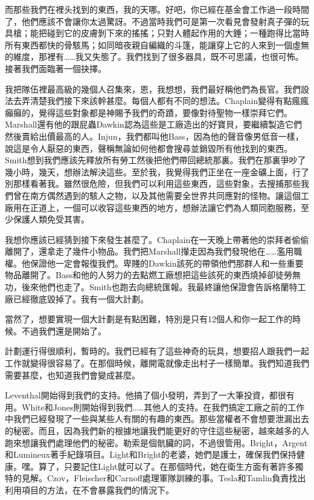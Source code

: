 而那些我們在裡头找到的東西，我的天哪。好吧，你已經在基金會工作過一段時間了，他們應該不會讓你太過驚訝。不過當時我們可是第一次看見會發射真子彈的玩具槍；能把碰到它的皮膚剝下來的搖搖；只對人體起作用的大錘；一種跑得比當時所有東西都快的骨駭馬；如同暗夜親自編織的斗篷，能讓穿上它的人來到一個虛無的維度，那裡有……我又失態了。我們找到了很多器具，既不可思議，也很可怖。接著我們面臨著一個抉擇。

我把隊伍裡最高級的幾個人召集來，恩，我想想，我們最好稱他們為長官。我們設法去弄清楚我們接下來該幹甚麼。每個人都有不同的想法。Chaplain變得有點瘋瘋癲癲的，覺得這些對象都是神賜予我們的奇蹟，要像對待聖物一樣崇拜它們。Marshall還有他的跟屁蟲Dawkin認為這些是工廠造出的好寶貝，要繼續製造它們然後賣給出價最高的人。Injun，我們都叫他Bass，因為他的聲音像男低音一樣，說這是令人厭惡的東西，聲稱無論如何他都會搜尋並銷毀所有他找到的東西。Smith想到我們應該先釋放所有勞工然後把他們帶回總統那裏。我們在那裏爭吵了幾小時，幾天，想辦法解決這些。至於我，我覺得我們正坐在一座金礦上面，行了別那樣看著我。雖然很危險，但我們可以利用這些東西，這些對象，去搜捕那些我們曾在南方偶然遇到的駭人之物，以及其他需要全世界共同應對的怪物。讓這個工廠用在正道上，一個可以收容這些東西的地方，想辦法讓它們為人類同胞服務，至少保護人類免受其害。

我想你應該已經猜到接下來發生甚麼了。Chaplain在一天晚上帶著他的崇拜者偷偷離開了，還拿走了幾件小物品。我們把Marshall攆走因為我們發現他在……濫用職權。他保證他一定會報復我們。卑賤的Dawkin該死的帶領他們那群人和一些重要物品離開了。Bass和他的人努力的去點燃工廠想把這些該死的東西燒掉卻徒勞無功，後來他們也走了。Smith也跑去向總統匯報。我最終讓他保證會告訴格蘭特工廠已經徹底毀掉了。我有一個大計劃。

當然了，想要實現一個大計劃是有點困難，特別是只有12個人和你一起工作的時候。不過我們還是開始了。

計劃運行得很順利，暫時的。我們已經有了這些神奇的玩具，想要招人跟我們一起工作就變得很容易了。在那個時候，離開電就像走出村子一樣簡單。我們知道我們需要甚麼，也知道我們會變成甚麼。

Leventhal開始得到我們的支持。他搞了個小發明，弄到了一大筆投資，都很有用。White和Jones則開始得到我們……其他人的支持。在我們搞定工廠之前的工作中我們已經發現了一些與某些人有關的有趣的東西。那些當權者不會想要泄漏出去的秘密。而且，因為我們新的根據地讓我們能更好的守住這些秘密，越來越多的人跑來想讓我們處理他們的秘密。勒索是個骯臟的詞，不過很管用。Bright，Argent和Lumineux著手紀錄項目。Light和Bright的老婆，她們是護士，確保我們保持健康。嘿。算了，只要記住Light就可以了。在那個時代，她在衛生方面有著許多獨特的見解。Czov，Fleischer和Carnoff處理軍隊訓練的事。Tesla和Tamlin負責找出利用項目的方法，在不會暴露我們的情況下。

